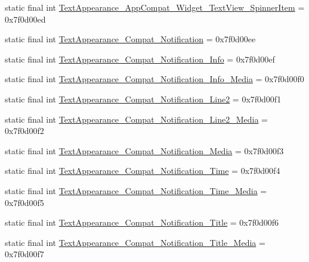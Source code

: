 \begin{DoxyCompactItemize}
\item 
static final int \mbox{\hyperlink{classandroid_1_1support_1_1design_1_1_r_1_1style_ad467a646dc2a35f3211088174bdaa35a}{Text\+Appearance\+\_\+\+App\+Compat\+\_\+\+Widget\+\_\+\+Text\+View\+\_\+\+Spinner\+Item}} = 0x7f0d00ed
\item 
static final int \mbox{\hyperlink{classandroid_1_1support_1_1design_1_1_r_1_1style_a487414a4cbdc32b80697b782ccfed21a}{Text\+Appearance\+\_\+\+Compat\+\_\+\+Notification}} = 0x7f0d00ee
\item 
static final int \mbox{\hyperlink{classandroid_1_1support_1_1design_1_1_r_1_1style_a0fb52461a8264f9e9553368f5ccdc2bd}{Text\+Appearance\+\_\+\+Compat\+\_\+\+Notification\+\_\+\+Info}} = 0x7f0d00ef
\item 
static final int \mbox{\hyperlink{classandroid_1_1support_1_1design_1_1_r_1_1style_ae10a31bb7a17822b305d01fca629f8db}{Text\+Appearance\+\_\+\+Compat\+\_\+\+Notification\+\_\+\+Info\+\_\+\+Media}} = 0x7f0d00f0
\item 
static final int \mbox{\hyperlink{classandroid_1_1support_1_1design_1_1_r_1_1style_a99d5d0816dc4e136d9c79cd8210772f1}{Text\+Appearance\+\_\+\+Compat\+\_\+\+Notification\+\_\+\+Line2}} = 0x7f0d00f1
\item 
static final int \mbox{\hyperlink{classandroid_1_1support_1_1design_1_1_r_1_1style_a8fa580dbbad63e141d1f783314843f38}{Text\+Appearance\+\_\+\+Compat\+\_\+\+Notification\+\_\+\+Line2\+\_\+\+Media}} = 0x7f0d00f2
\item 
static final int \mbox{\hyperlink{classandroid_1_1support_1_1design_1_1_r_1_1style_acf42b6f9cd6ea2fdcc71c5847e1aa944}{Text\+Appearance\+\_\+\+Compat\+\_\+\+Notification\+\_\+\+Media}} = 0x7f0d00f3
\item 
static final int \mbox{\hyperlink{classandroid_1_1support_1_1design_1_1_r_1_1style_aa6fb2ecafc656d3b597997e308536368}{Text\+Appearance\+\_\+\+Compat\+\_\+\+Notification\+\_\+\+Time}} = 0x7f0d00f4
\item 
static final int \mbox{\hyperlink{classandroid_1_1support_1_1design_1_1_r_1_1style_ad9e0e499e4087f2c67338031aa4b90ad}{Text\+Appearance\+\_\+\+Compat\+\_\+\+Notification\+\_\+\+Time\+\_\+\+Media}} = 0x7f0d00f5
\item 
static final int \mbox{\hyperlink{classandroid_1_1support_1_1design_1_1_r_1_1style_a2b750bbab2fe859efd2a6cecf5dcad34}{Text\+Appearance\+\_\+\+Compat\+\_\+\+Notification\+\_\+\+Title}} = 0x7f0d00f6
\item 
static final int \mbox{\hyperlink{classandroid_1_1support_1_1design_1_1_r_1_1style_a9bb3c62bf251619fda352ac6002f3115}{Text\+Appearance\+\_\+\+Compat\+\_\+\+Notification\+\_\+\+Title\+\_\+\+Media}} = 0x7f0d00f7

\end{DoxyCompactItemize}

